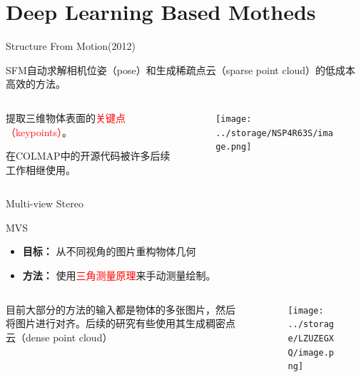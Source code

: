 \documentclass[dark]{sintefbeamer}
\begin{document}
\section{Deep Learning Based Motheds}

\begin{frame}[fragile]{Structure From Motion(2012)}

SFM\cite{westobyStructurefromMotionPhotogrammetryLowcost2012}自动求解相机位姿（pose）和生成稀疏点云（sparse point cloud）的低成本高效的方法。

\begin{columns}
  \begin{column}{0.5\textwidth}
    提取三维物体表面的\textcolor{red}{关键点（keypoints）}。

    在COLMAP\cite{schonbergerStructurefromMotionRevisited2016}中的开源代码被许多后续工作相继使用。

  \end{column}

  \begin{column}{0.5\textwidth}
    \begin{figure}
      \texttt{[image: ../storage/NSP4R63S/image.png]}
    \end{figure}
  \end{column}
\end{columns}

\end{frame}

\begin{frame}[fragile]{Multi-view Stereo}

 MVS\cite{seitzComparisonEvaluationMultiView2006}
 \begin{itemize}
  \item \textbf{目标：} 从不同视角的图片重构物体几何
  \item \textbf{方法：} 使用\textcolor{red}{三角测量原理}来手动测量绘制。
 \end{itemize}

 \begin{columns}
  \begin{column}{0.5\textwidth}
    目前大部分的方法的输入都是物体的多张图片，然后将图片进行对齐。\cite{furukawaMultiviewStereoTutorial2015}后续的研究有些使用其生成稠密点云（dense point cloud）

  \end{column}

  \begin{column}{0.5\textwidth}
    \begin{figure}
      \texttt{[image: ../storage/LZUZEGXQ/image.png]}
    \end{figure}
  \end{column}
\end{columns}

\end{frame}
\end{document}
